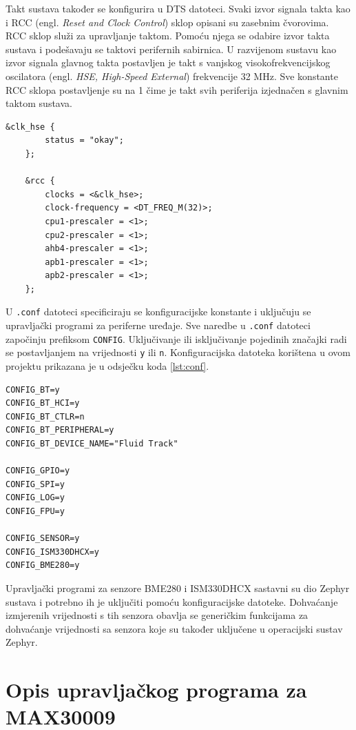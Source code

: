 \documentclass[../diplomski_rad.tex]{subfiles}
\begin{document}
Takt sustava također se konfigurira u DTS datoteci. Svaki izvor signala takta kao i 
RCC (engl. \textit{Reset and Clock Control}) sklop opisani su zasebnim čvorovima. 
RCC sklop služi za upravljanje taktom. Pomoću njega se odabire izvor takta sustava i podešavaju se 
taktovi perifernih sabirnica. 
U razvijenom sustavu kao izvor signala glavnog takta postavljen je takt s vanjskog visokofrekvencijskog 
oscilatora (engl. \textit{HSE, High-Speed External}) frekvencije 32 MHz. Sve konstante RCC sklopa postavljenje su na 1 
čime je takt svih periferija izjednačen s glavnim taktom sustava.   
\begin{lstlisting}[label={lst:takt},style=CStyle,caption={Konfiguracijska takta sustava},captionpos=b]
    &clk_hse {
        status = "okay";
    };

    &rcc {
        clocks = <&clk_hse>;
        clock-frequency = <DT_FREQ_M(32)>;
        cpu1-prescaler = <1>;
        cpu2-prescaler = <1>;
        ahb4-prescaler = <1>;
        apb1-prescaler = <1>;
        apb2-prescaler = <1>;
    };
\end{lstlisting} 

U \texttt{.conf} datoteci specificiraju se 
konfiguracijske konstante i uključuju se upravljački programi za periferne uređaje. 
Sve naredbe u \texttt{.conf} datoteci započinju prefiksom \texttt{CONFIG}. 
Uključivanje ili isključivanje pojedinih značajki radi se postavljanjem na vrijednosti \texttt{y} ili \texttt{n}.
Konfiguracijska datoteka korištena u ovom projektu prikazana je u odsječku koda \ref{lst:conf}.
\begin{lstlisting}[label={lst:conf},style=CStyle,caption={Konfiguracijska datoteka razvijenog sustava},captionpos=b]
CONFIG_BT=y
CONFIG_BT_HCI=y
CONFIG_BT_CTLR=n
CONFIG_BT_PERIPHERAL=y
CONFIG_BT_DEVICE_NAME="Fluid Track"

CONFIG_GPIO=y
CONFIG_SPI=y
CONFIG_LOG=y
CONFIG_FPU=y

CONFIG_SENSOR=y
CONFIG_ISM330DHCX=y
CONFIG_BME280=y
\end{lstlisting} 

Upravljački programi za senzore BME280 i ISM330DHCX sastavni su dio Zephyr sustava i potrebno ih je uključiti 
pomoću konfiguracijske datoteke. 
Dohvaćanje izmjerenih vrijednosti s tih senzora obavlja se generičkim funkcijama za dohvaćanje vrijednosti sa senzora koje 
su također uključene u operacijski sustav Zephyr. 

\section{Opis upravljačkog programa za MAX30009}
\end{document}
